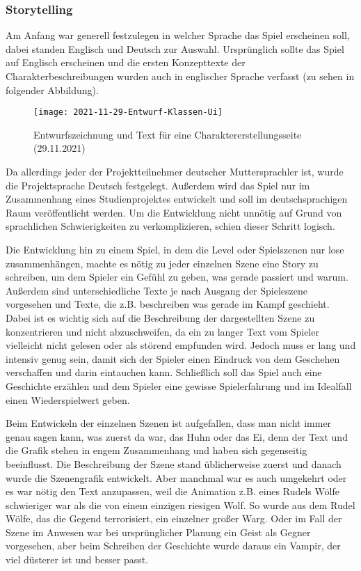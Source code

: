 \subsubsection{Storytelling} Am Anfang war generell festzulegen in welcher Sprache das Spiel erscheinen soll, dabei standen Englisch und Deutsch zur Auswahl. Ursprünglich sollte das Spiel auf Englisch erscheinen und die ersten Konzepttexte der Charakterbeschreibungen wurden auch in englischer Sprache verfasst (zu sehen in folgender Abbildung). 

\begin{figure}[H]
    \centering
    \caption{Entwurfszeichnung und Text für eine Charaktererstellungsseite (29.11.2021)}
    \label{fig:2021-11-29-Entwurf-Klassen-Ui}
    \texttt{[image: 2021-11-29-Entwurf-Klassen-Ui]}
\end{figure}

Da allerdings jeder der Projektteilnehmer deutscher Muttersprachler ist, wurde die Projektsprache Deutsch festgelegt. Außerdem wird das Spiel nur im Zusammenhang eines Studienprojektes entwickelt und soll im deutschsprachigen Raum veröffentlicht werden. Um die Entwicklung nicht unnötig auf Grund von sprachlichen Schwierigkeiten zu verkomplizieren, schien dieser Schritt logisch. 

Die Entwicklung hin zu einem Spiel, in dem die Level oder Spielszenen nur lose zusammenhängen, machte es nötig zu jeder einzelnen Szene eine Story zu schreiben, um dem Spieler ein Gefühl zu geben, was gerade passiert und warum. Außerdem sind unterschiedliche Texte je nach Ausgang der Spieleszene vorgesehen und Texte, die z.B. beschreiben was gerade im Kampf geschieht. Dabei ist es wichtig sich auf die Beschreibung der dargestellten Szene zu konzentrieren und nicht abzuschweifen, da ein zu langer Text vom Spieler vielleicht nicht gelesen oder als störend empfunden wird. Jedoch muss er lang und intensiv genug sein, damit sich der Spieler einen Eindruck von dem Geschehen verschaffen und darin eintauchen kann. Schließlich soll das Spiel auch eine Geschichte erzählen und dem Spieler eine gewisse Spielerfahrung und im Idealfall einen Wiederspielwert geben. 

Beim Entwickeln der einzelnen Szenen ist aufgefallen, dass man nicht immer genau sagen kann, was zuerst da war, das Huhn oder das Ei, denn der Text und die Grafik stehen in engem Zusammenhang und haben sich gegenseitig beeinflusst. Die Beschreibung der Szene stand üblicherweise zuerst und danach wurde die Szenengrafik entwickelt. Aber manchmal war es auch umgekehrt oder es war nötig den Text anzupassen, weil die Animation z.B. eines Rudels Wölfe schwieriger war als die von einem einzigen riesigen Wolf. So wurde aus dem Rudel Wölfe, das die Gegend terrorisiert, ein einzelner großer Warg. Oder im Fall der Szene im Anwesen war bei ursprünglicher Planung ein Geist als Gegner vorgesehen, aber beim Schreiben der Geschichte wurde daraus ein Vampir, der viel düsterer ist und besser passt.

